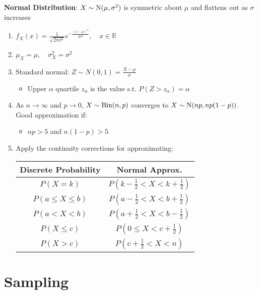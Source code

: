 \documentclass[12pt, a4paper]{article}
\begin{document}
\begin{multicols*}{3}
\textbf{Normal Distribution}: $ X \sim \text{N}(\mu, \sigma^2)$ is symmetric about $\mu$ and flattens out as $\sigma$ increases
\begin{enumerate}[\roman*.]
  \item $ f_X(x) = \frac{1}{\sqrt{2\pi \sigma^2}} e^{-\frac{(x - \mu)^2}{2\sigma^2}},\quad x \in \mathbb{R} $
  \item $ \mu_X = \mu,\quad \sigma^2_X = \sigma^2 $
  \item Standard normal: $ Z \sim N(0, 1) = \frac{X-\mu}{\sigma}$
    \begin{itemize}\vspace{2pt }
      \item Upper $\alpha$ quartile $z_{\alpha}$ is the value s.t. $P(Z > z_{\alpha}) = \alpha$ 
    \end{itemize}
  \item As $n\rightarrow \infty$ and $p \rightarrow 0$, $X \sim \text{Bin}(n, p)$ converges to $X \sim \text{N}(np, np(1-p))$. Good approximation if:
    \begin{itemize}\vspace{2pt }
      \item $np>5$ and $n(1-p)>5$
    \end{itemize}
  \item Apply the continuity corrections for approximating:\\\vspace{1em}
    \begin{tabular}{|c|c|}
      \hline
      \textbf{Discrete Probability} & \textbf{Normal Approx.} \\
      \hline
      \( P(X = k) \) & \( P\left(k - \frac{1}{2} < X < k + \frac{1}{2}\right) \) \\
      \hline
      \( P(a \leq X \leq b) \) & \( P\left(a - \frac{1}{2} < X < b + \frac{1}{2}\right) \) \\
      \hline
      \( P(a < X < b) \) & \( P\left(a + \frac{1}{2} < X < b - \frac{1}{2}\right) \) \\
      \hline
      \( P(X \leq c) \) & \( P\left(0 \leq X < c + \frac{1}{2}\right) \) \\
      \hline
      \( P(X > c) \) & \( P\left(c + \frac{1}{2} < X < n\right) \) \\
      \hline
      \end{tabular}
\end{enumerate}

\colbreak
\section{Sampling}


\end{multicols*}
\end{document}
